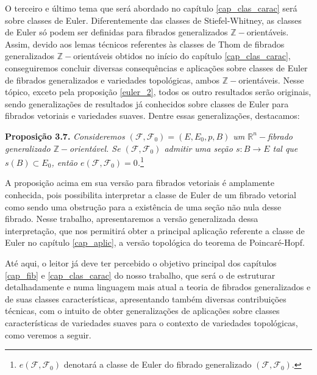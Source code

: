 \documentclass[12pt,oneside]{book} %
\newcommand{\R}{\mathbb{R}}
\newcommand{\Z}{\mathbb{Z}}
\begin{document}
\par O terceiro e último tema que será abordado no capítulo \ref{cap_clas_carac} será sobre classes de Euler. Diferentemente das classes de Stiefel-Whitney, as classes de Euler só podem ser definidas para fibrados generalizados $\Z-$orientáveis. Assim, devido aos lemas técnicos referentes às classes de Thom de fibrados generalizados $\Z-$orientáveis obtidos no início do capítulo \ref{cap_clas_carac}, conseguiremos concluir diversas consequências e aplicações sobre classes de Euler de fibrados generalizados e variedades topológicas, ambos $\Z-$orientáveis. Nesse tópico, exceto pela proposição \ref{euler_2}, todos os outro resultados serão originais, sendo generalizações de resultados já conhecidos sobre classes de Euler para fibrados vetoriais e variedades suaves. Dentre essas generalizações, destacamos:\newline

\par\textbf{Proposição 3.7. }\textit{Consideremos $(\mathcal{F},\mathcal{F}_{0})=(E,E_{0},p,B)$ um $\R^{n}-$fibrado generalizado $\Z-$orientável. Se $(\mathcal{F},\mathcal{F}_{0})$ admitir uma seção $s:B\to E$ tal que $s(B)\subset E_{0}$, então $e(\mathcal{F},\mathcal{F}_{0})=0$.}\footnote{$e(\mathcal{F},\mathcal{F}_{0})$ denotará a classe de Euler do fibrado generalizado $(\mathcal{F},\mathcal{F}_{0})$.}\newline

\par A proposição acima em sua versão para fibrados vetoriais é amplamente conhecida, pois possibilita interpretar a classe de Euler de um fibrado vetorial como sendo uma obstrução para a existência de uma seção não nula desse fibrado. Nesse trabalho, apresentaremos a versão generalizada dessa interpretação, que nos permitirá obter a principal aplicação referente a classe de Euler no capítulo \ref{cap_aplic}, a versão topológica do teorema de Poincaré-Hopf.

\par Até aqui, o leitor já deve ter percebido o objetivo principal dos capítulos \ref{cap_fib} e \ref{cap_clas_carac} do nosso trabalho, que será o de estruturar detalhadamente e numa linguagem mais atual a teoria de fibrados generalizados e de suas classes características, apresentando também diversas contribuições técnicas, com o intuito de obter generalizações de aplicações sobre classes características de variedades suaves para o contexto de variedades topológicas, como veremos a seguir.
\end{document}
